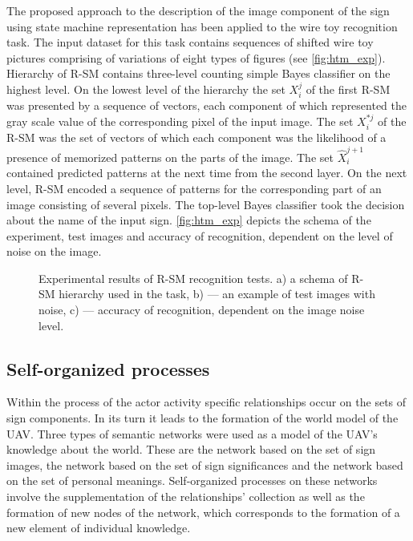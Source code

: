 \documentclass[review]{elsarticle}
\begin{document}
The proposed approach to the description of the image component of the sign using state machine representation has been applied to the wire toy recognition task. The input dataset for this task contains sequences of shifted wire toy pictures comprising of variations of eight types of figures (see \autoref{fig:htm_exp}). Hierarchy of R-SM contains three-level counting simple Bayes classifier on the highest level. On the lowest level of the hierarchy the set $X_i^j$ of the first R-SM was presented by a sequence of vectors, each component of which represented the gray scale value of the corresponding pixel of the input image. The set $X_i^{*j}$ of the R-SM was the set of vectors of which each component was the likelihood of a presence of memorized patterns on the parts of the image. The set $\hat X_i^{j + 1}$ contained predicted patterns at the next time from the second layer. On the next level, R-SM encoded a sequence of patterns for the corresponding part of an image consisting of several pixels. The top-level Bayes classifier took the decision about the name of the input sign. \autoref{fig:htm_exp} depicts the schema of the experiment, test images and accuracy of recognition, dependent on the level of noise on the image.

\begin{figure}[h]
	\caption{Experimental results of R-SM recognition tests. a) a schema of R-SM hierarchy used in the task, b) --- an example of test images with noise, c) --- accuracy of recognition, dependent on the image noise level.}
	\label{fig:htm_exp}	
\end{figure}

\subsection{Self-organized processes}
Within the process of the actor activity specific relationships occur on the sets of sign components. In its turn it leads to the formation of the world model of the UAV. Three types of semantic networks were used as a model of the UAV's knowledge about the world. These are the network based on the set of sign images, the network based on the set of sign significances and the network based on the set of personal meanings. Self-organized processes on these networks involve the supplementation of the relationships' collection as well as the formation of new nodes of the network, which corresponds to the formation of a new element of individual knowledge.
\end{document}
